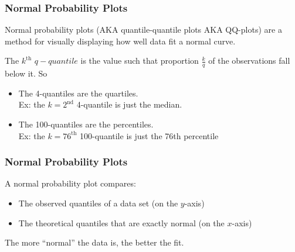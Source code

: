 \documentclass[handout]{beamer}
\newcommand{\blue}[1]{\textcolor{blue2}{#1}}
\begin{document}
\begin{frame}
\frametitle{Normal Probability Plots}
\blue{Normal probability plots} (AKA quantile-quantile plots AKA QQ-plots) are a method for visually displaying how well data fit a normal curve.

\vspace{0.75cm}

\pause The $k^{\mbox{th}}$ \blue{$q-quantile$} is the value such that proportion $\frac{k}{q}$ of the observations fall below it.  So 
\begin{itemize}
\pause\item The 4-quantiles are the \blue{quartiles}.\\
Ex: the $k=2^{\mbox{nd}}$ 4-quantile is just the median.  
\pause\item The 100-quantiles are the \blue{percentiles}.\\
Ex: the $k=76^{\mbox{th}}$ 100-quantile is just the 76th percentile
\end{itemize}

\end{frame}


\begin{frame}
\frametitle{Normal Probability Plots}
A normal probability plot compares:

\begin{itemize}
\item The \blue{observed} quantiles of a data set (on the $y$-axis)
\item The \blue{theoretical} quantiles that are \blue{exactly} normal (on the $x$-axis)
\end{itemize}

\pause\vspace{0.5cm}

The more ``normal'' the data is, the better the fit.  

\end{frame}
\end{document}
